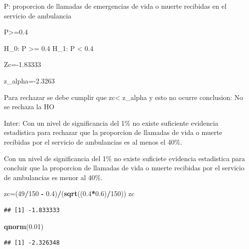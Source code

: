\documentclass[
]{article}
\newenvironment{Shaded}{\begin{snugshade}}{\end{snugshade}}
\newcommand{\DecValTok}[1]{\textcolor[rgb]{0.00,0.00,0.81}{#1}}
\newcommand{\FloatTok}[1]{\textcolor[rgb]{0.00,0.00,0.81}{#1}}
\newcommand{\FunctionTok}[1]{\textcolor[rgb]{0.13,0.29,0.53}{\textbf{#1}}}
\newcommand{\NormalTok}[1]{#1}
\newcommand{\OtherTok}[1]{\textcolor[rgb]{0.56,0.35,0.01}{#1}}
\newcommand{\SpecialCharTok}[1]{\textcolor[rgb]{0.81,0.36,0.00}{\textbf{#1}}}
\begin{document}
P: proporcion de llamadas de emergencias de vida o muerte recibidas en
el servicio de ambulancia

P\textgreater=0.4

H\_0: P \textgreater= 0.4 H\_1: P \textless{} 0.4

Zc=-1.83333

z\_alpha=-2.3263

Para rechazar se debe cumplir que zc\textless{} z\_alpha y esto no
ocurre conclusion: No se rechaza la HO

Inter: Con un nivel de significancia del 1\% no existe suficiente
evidencia estadistica para rechazar que la proporcion de llamadas de
vida o muerte recibidas por el servicio de ambulancias es al menos el
40\%.

Con un nivel de significancia del 1\% no existe suficiete evidencia
estadistica para concluir que la proporcion de llamadas de vida o muerte
recibidas por el servicio de ambulancias es menor al 40\%.

\begin{Shaded}
\begin{Highlighting}[]
\NormalTok{zc}\OtherTok{=}\NormalTok{(}\DecValTok{49}\SpecialCharTok{/}\DecValTok{150} \SpecialCharTok{{-}} \FloatTok{0.4}\NormalTok{)}\SpecialCharTok{/}\NormalTok{(}\FunctionTok{sqrt}\NormalTok{((}\FloatTok{0.4}\SpecialCharTok{*}\FloatTok{0.6}\NormalTok{)}\SpecialCharTok{/}\DecValTok{150}\NormalTok{))}
\NormalTok{zc}
\end{Highlighting}
\end{Shaded}

\begin{verbatim}
## [1] -1.833333
\end{verbatim}

\begin{Shaded}
\begin{Highlighting}[]
\FunctionTok{qnorm}\NormalTok{(}\FloatTok{0.01}\NormalTok{)}
\end{Highlighting}
\end{Shaded}

\begin{verbatim}
## [1] -2.326348
\end{verbatim}
\end{document}
